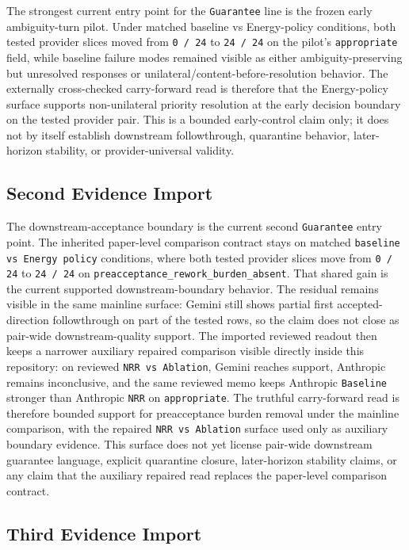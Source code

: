 \documentclass[11pt]{article}
\begin{document}
The strongest current entry point for the \texttt{Guarantee} line is the frozen
early ambiguity-turn pilot. Under matched baseline vs Energy-policy conditions,
both tested provider slices moved from \texttt{0 / 24} to \texttt{24 / 24} on the
pilot's \texttt{appropriate} field, while baseline failure modes remained visible
as either ambiguity-preserving but unresolved responses or
unilateral/content-before-resolution behavior. The externally cross-checked
carry-forward read is therefore that the Energy-policy surface supports
non-unilateral priority resolution at the early decision boundary on the tested
provider pair. This is a bounded early-control claim only; it does not by itself
establish downstream followthrough, quarantine behavior, later-horizon stability,
or provider-universal validity.

\subsection{Second Evidence Import}

The downstream-acceptance boundary is the current second \texttt{Guarantee}
entry point. The inherited paper-level comparison contract stays on matched
\texttt{baseline vs Energy policy} conditions, where both tested provider
slices move from \texttt{0 / 24} to \texttt{24 / 24} on
\texttt{preacceptance\_rework\_burden\_absent}. That shared gain is the current
supported downstream-boundary behavior. The residual remains visible in the
same mainline surface: Gemini still shows partial first accepted-direction
followthrough on part of the tested rows, so the claim does not close as
pair-wide downstream-quality support. The imported reviewed readout then keeps a
narrower auxiliary repaired comparison visible directly inside this repository:
on reviewed \texttt{NRR vs Ablation}, Gemini reaches support, Anthropic remains
inconclusive, and the same reviewed memo keeps Anthropic \texttt{Baseline}
stronger than Anthropic \texttt{NRR} on \texttt{appropriate}. The truthful
carry-forward read is therefore bounded support for preacceptance burden
removal under the mainline comparison, with the repaired \texttt{NRR vs
Ablation} surface used only as auxiliary boundary evidence. This surface does
not yet license pair-wide downstream guarantee language, explicit quarantine
closure, later-horizon stability claims, or any claim that the auxiliary
repaired read replaces the paper-level comparison contract.

\subsection{Third Evidence Import}
\end{document}

